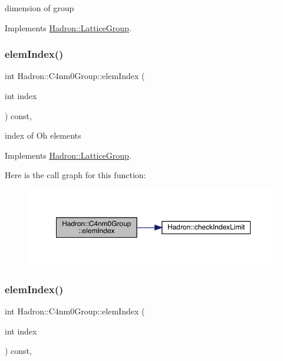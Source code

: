 dimension of group 

Implements \mbox{\hyperlink{structHadron_1_1LatticeGroup_abd8415698323796ef6a8605796ee3bea}{Hadron\+::\+Lattice\+Group}}.

\mbox{\label{structHadron_1_1C4nm0Group_a700a48f1865a634b774127d8710e1ecc}} 
\subsubsection{\texorpdfstring{elemIndex()}{elemIndex()}\hspace{0.1cm}{\footnotesize\ttfamily [1/3]}}
{\footnotesize\ttfamily int Hadron\+::\+C4nm0\+Group\+::elem\+Index (\begin{DoxyParamCaption}\item[{int}]{index }\end{DoxyParamCaption}) const\hspace{0.3cm}{\ttfamily [inline]}, {\ttfamily [virtual]}}

index of Oh elements 

Implements \mbox{\hyperlink{structHadron_1_1LatticeGroup_afb8e3ee60de059f75bce1044c694e1e8}{Hadron\+::\+Lattice\+Group}}.

Here is the call graph for this function\+:
\nopagebreak
\begin{figure}[H]
\begin{center}
\leavevmode
\includegraphics[width=350pt]{da/da1/structHadron_1_1C4nm0Group_a700a48f1865a634b774127d8710e1ecc_cgraph}
\end{center}
\end{figure}
\mbox{\label{structHadron_1_1C4nm0Group_a700a48f1865a634b774127d8710e1ecc}} 
\subsubsection{\texorpdfstring{elemIndex()}{elemIndex()}\hspace{0.1cm}{\footnotesize\ttfamily [2/3]}}
{\footnotesize\ttfamily int Hadron\+::\+C4nm0\+Group\+::elem\+Index (\begin{DoxyParamCaption}\item[{int}]{index }\end{DoxyParamCaption}) const\hspace{0.3cm}{\ttfamily [inline]}, {\ttfamily [virtual]}}

